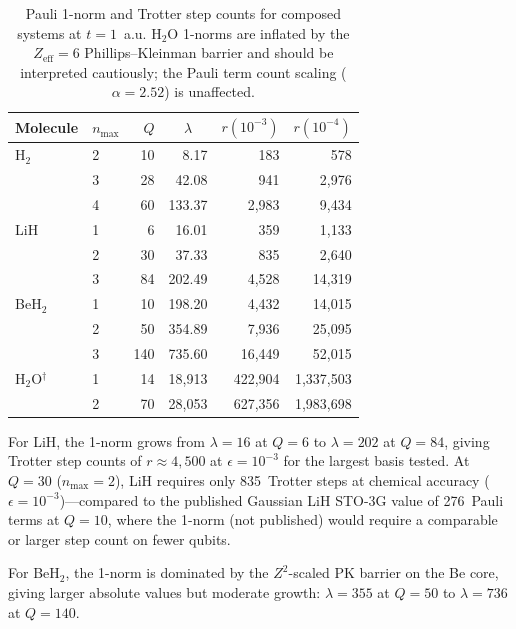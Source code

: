 \documentclass[aps,pra,twocolumn,superscriptaddress,longbibliography]{revtex4-2}
\begin{document}
\begin{table}[t]
\caption{Pauli 1-norm and Trotter step counts for composed systems at
$t = 1$~a.u.  H$_2$O 1-norms are inflated by the $Z_{\mathrm{eff}} = 6$
Phillips--Kleinman barrier and should be interpreted cautiously; the
Pauli term count scaling ($\alpha = 2.52$) is unaffected.}
\label{tab:composed_onenorm}
\begin{ruledtabular}
\begin{tabular}{llrd{3.2}rr}
Molecule & $n_{\max}$ & $Q$ & 
 & $r(10^{-3})$ & $r(10^{-4})$ \\
\hline
H$_2$ & 2 &  10 &     8.17 &        183 &        578 \\
      & 3 &  28 &    42.08 &        941 &      2{,}976 \\
      & 4 &  60 &   133.37 &      2{,}983 &      9{,}434 \\
\hline
LiH   & 1 &   6 &    16.01 &        359 &      1{,}133 \\
      & 2 &  30 &    37.33 &        835 &      2{,}640 \\
      & 3 &  84 &   202.49 &      4{,}528 &     14{,}319 \\
\hline
BeH$_2$ & 1 &  10 &   198.20 &      4{,}432 &     14{,}015 \\
      & 2 &  50 &   354.89 &      7{,}936 &     25{,}095 \\
      & 3 & 140 &   735.60 &     16{,}449 &     52{,}015 \\
\hline
H$_2$O$^\dagger$ & 1 &  14 & 18{,}913 &  422{,}904 & 1{,}337{,}503 \\
      & 2 &  70 & 28{,}053 &  627{,}356 & 1{,}983{,}698 \\
\end{tabular}
\end{ruledtabular}
\end{table}

For LiH, the 1-norm grows from $\lambda = 16$ at $Q = 6$ to
$\lambda = 202$ at $Q = 84$, giving Trotter step counts of
$r \approx 4{,}500$ at $\epsilon = 10^{-3}$ for the largest basis
tested.  At $Q = 30$ ($n_{\max} = 2$), LiH requires only 835~Trotter
steps at chemical accuracy ($\epsilon = 10^{-3}$)---compared to the
published Gaussian LiH STO-3G value of 276~Pauli terms at $Q = 10$,
where the 1-norm (not published) would require a comparable or larger
step count on fewer qubits.

For BeH$_2$, the 1-norm is dominated by the $Z^2$-scaled PK barrier
on the Be core, giving larger absolute values but moderate growth:
$\lambda = 355$ at $Q = 50$ to $\lambda = 736$ at $Q = 140$.
\end{document}
